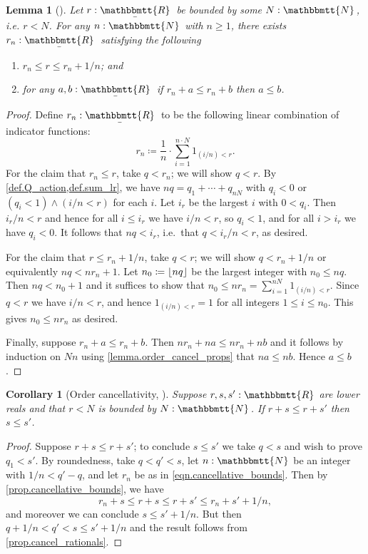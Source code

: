 \documentclass[11pt, oneside, article]{memoir}
\theoremstyle{plain}
\newtheorem{corollary}[theorem]{Corollary}
\newtheorem{lemma}[theorem]{Lemma}
\theoremstyle{definition}
\theoremstyle{remark}
\DeclarePairedDelimiter{\floor}{\lfloor}{\rfloor}
\newcommand{\ubar}[1]{\underaccent{\bar}{#1}}
\newcommand{\ind}[1]{1_{#1}}
\newcommand{\internal}[1]{\raisebox{-.03ex}{$\mathbbmtt{#1}$}}
\newcommand{\hs}{\hspace{1.1pt}}
\newcommand{\tnn}{\internal{N}\hs}
\newcommand{\trr}{\internal{R}\hs}
\newcommand{\tlrr}{\ubar{\trr}\hs}
\begin{document}
\begin{lemma}[\cite{Henry}]\label{lemma.cancellative_bounds}
Let $r:\tlrr$ be bounded by some $N:\tnn$, i.e. $r<N$. For any $n:\tnn$ with $n\geq 1$, there exists $r_n:\tlrr$ satisfying the following
\begin{enumerate}
	\item $r_n\leq r\leq r_n+1/n$; and
	\item for any $a,b:\tlrr$ if $r_n+a\leq r_n+b$ then $a\leq b$.
\end{enumerate}
\end{lemma}
\begin{proof}
Define $r_n:\tlrr$ to be the following linear combination of indicator functions:
\begin{equation}\label{eqn.cancellative_bounds}
r_n\coloneqq \frac{1}{n}\cdot\sum_{i=1}^{n\cdot N}\ind{(i/n)<r}.
\end{equation}
For the claim that $r_n\leq r$, take $q<r_n$; we will show $q<r$. By \cref{def.Q_action,def.sum_lr}, we have $nq=q_1+\cdots+q_{nN}$ with $q_i<0$ or $(q_i<1)\wedge (i/n<r)$ for each $i$. Let $i_r$ be the largest $i$ with $0<q_i$. Then $i_r/n<r$ and hence for all $i\leq i_r$ we have $i/n<r$, so $q_i<1$, and for all $i>i_r$ we have $q_i<0$. It follows that $nq<i_r$, i.e.\ that $q<i_r/n<r$, as desired.

For the claim that $r\leq r_n+1/n$, take $q<r$; we will show $q<r_n+1/n$ or equivalently $nq<nr_n+1$. Let $n_0\coloneqq\floor{nq}$ be the largest integer with $n_0\leq nq$. Then $nq<n_0+1$ and it suffices to show that $n_0\leq nr_n=\sum_{i=1}^{nN}\ind{(i/n)<r}$. Since $q<r$ we have $i/n<r$, and hence $\ind{(i/n)<r}=1$ for all integers $1\leq i\leq n_0$. This gives $n_0\leq nr_n$ as desired.

Finally, suppose $r_n+a\leq r_n+b$. Then $nr_n+na\leq nr_n+nb$ and it follows by induction on $Nn$ using \cref{lemma.order_cancel_props} that $na\leq nb$. Hence $a\leq b$.
\end{proof}

\begin{corollary}[Order cancellativity, \cite{Henry}]\label{cor.order_cancel}
Suppose $r,s,s':\trr$ are lower reals and that $r<N$ is bounded by $N:\tnn$. If $r+s\leq r+s'$ then $s\leq s'$.
\end{corollary}
\begin{proof}
Suppose $r+s\leq r+s'$; to conclude $s\leq s'$ we take $q<s$ and wish to prove $q_1<s'$. By roundedness, take $q<q'<s$, let $n:\tnn$ be an integer with $1/n<q'-q$, and let $r_n$ be as in \eqref{eqn.cancellative_bounds}. Then by \cref{prop.cancellative_bounds}, we have 
\[r_n+s\leq r+s\leq r+s'\leq r_n+s'+1/n,\]
and moreover we can conclude $s\leq s'+1/n$. But then $q+1/n<q'<s\leq s'+1/n$ and the result follows from \cref{prop.cancel_rationals}.
\end{proof}
\end{document}
